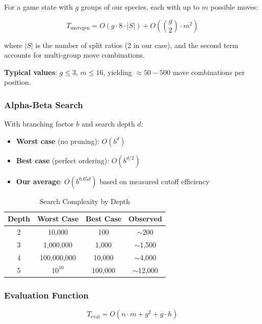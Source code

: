 \documentclass[11pt,a4paper]{article}
\begin{document}
For a game state with $g$ groups of our species, each with up to $m$ possible moves:

\begin{equation}
T_{\text{movegen}} = O(g \cdot 8 \cdot |S|) + O\left(\binom{g}{2} \cdot m^2\right)
\end{equation}

where $|S|$ is the number of split ratios (2 in our case), and the second term accounts for multi-group move combinations.

\textbf{Typical values}: $g \leq 3$, $m \leq 16$, yielding $\approx 50-500$ move combinations per position.

\subsubsection{Alpha-Beta Search}

With branching factor $b$ and search depth $d$:

\begin{itemize}
    \item \textbf{Worst case} (no pruning): $O(b^d)$
    \item \textbf{Best case} (perfect ordering): $O(b^{d/2})$
    \item \textbf{Our average}: $O(b^{0.65d})$ based on measured cutoff efficiency
\end{itemize}

\begin{table}[H]
\centering
\caption{Search Complexity by Depth}
\begin{tabular}{@{}cccc@{}}
\toprule
\textbf{Depth} & \textbf{Worst Case} & \textbf{Best Case} & \textbf{Observed} \\
\midrule
2 & 10,000 & 100 & $\sim$200 \\
3 & 1,000,000 & 1,000 & $\sim$1,500 \\
4 & 100,000,000 & 10,000 & $\sim$4,000 \\
5 & $10^{10}$ & 100,000 & $\sim$12,000 \\
\bottomrule
\end{tabular}
\end{table}

\subsubsection{Evaluation Function}

\begin{equation}
T_{\text{eval}} = O(n \cdot m + g^2 + g \cdot h)
\end{equation}
\end{document}
